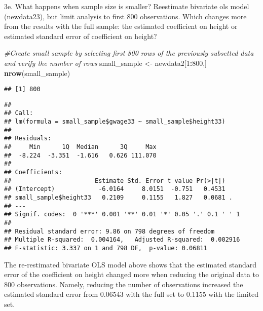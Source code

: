 \documentclass[]{article}
\newenvironment{Shaded}{\begin{snugshade}}{\end{snugshade}}
\newcommand{\KeywordTok}[1]{\textcolor[rgb]{0.13,0.29,0.53}{\textbf{#1}}}
\newcommand{\DecValTok}[1]{\textcolor[rgb]{0.00,0.00,0.81}{#1}}
\newcommand{\StringTok}[1]{\textcolor[rgb]{0.31,0.60,0.02}{#1}}
\newcommand{\CommentTok}[1]{\textcolor[rgb]{0.56,0.35,0.01}{\textit{#1}}}
\newcommand{\OperatorTok}[1]{\textcolor[rgb]{0.81,0.36,0.00}{\textbf{#1}}}
\newcommand{\NormalTok}[1]{#1}
\begin{document}
3e. What happens when sample size is smaller? Reestimate bivariate ols
model (newdata23), but limit analysis to first 800 observations. Which
changes more from the results with the full sample: the estimated
coefficient on height or estimated standard error of coefficient on
height?

\begin{Shaded}
\begin{Highlighting}[]
\CommentTok{#Create small sample by selecting first 800 rows of the previously subsetted data and verify the number of rows}
\NormalTok{small_sample <-}\StringTok{ }\NormalTok{newdata2[}\DecValTok{1}\OperatorTok{:}\DecValTok{800}\NormalTok{,]}
\KeywordTok{nrow}\NormalTok{(small_sample)}
\end{Highlighting}
\end{Shaded}

\begin{verbatim}
## [1] 800
\end{verbatim}

\begin{Shaded}
\end{Shaded}

\begin{verbatim}
## 
## Call:
## lm(formula = small_sample$gwage33 ~ small_sample$height33)
## 
## Residuals:
##     Min      1Q  Median      3Q     Max 
##  -8.224  -3.351  -1.616   0.626 111.070 
## 
## Coefficients:
##                       Estimate Std. Error t value Pr(>|t|)  
## (Intercept)            -6.0164     8.0151  -0.751   0.4531  
## small_sample$height33   0.2109     0.1155   1.827   0.0681 .
## ---
## Signif. codes:  0 '***' 0.001 '**' 0.01 '*' 0.05 '.' 0.1 ' ' 1
## 
## Residual standard error: 9.86 on 798 degrees of freedom
## Multiple R-squared:  0.004164,   Adjusted R-squared:  0.002916 
## F-statistic: 3.337 on 1 and 798 DF,  p-value: 0.06811
\end{verbatim}

The re-restimated bivariate OLS model above shows that the estimated
standard error of the coefficient on height changed more when reducing
the original data to 800 observations. Namely, reducing the number of
observations increased the estimated standard error from 0.06543 with
the full set to 0.1155 with the limited set.
\end{document}
